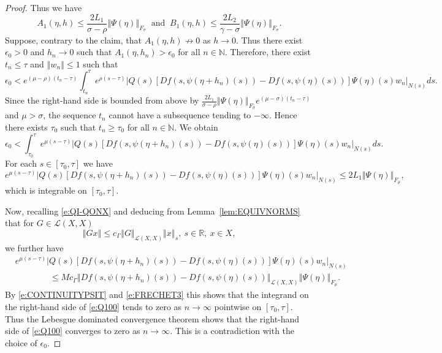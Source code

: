 \documentclass[10pt,a4paper]{amsart}
\newcommand{\N}{\mathbb{N}}
\newcommand{\R}{\mathbb{R}}
\newcommand{\norm}[1]{\left\Vert#1\right\Vert}
\renewcommand{\geq}{\geqslant}
\renewcommand{\leq}{\leqslant}
\begin{document}
\begin{proof}
Thus we have
$$A_1(\eta,h)\leq\frac{2L_1}{\sigma-\rho}\norm{\Psi(\eta)}_{F_\sigma}\ \text{ and }\ B_1(\eta,h)\leq\frac{2L_2}{\gamma-\sigma}\norm{\Psi(\eta)}_{F_\sigma}.$$
Suppose, contrary to the claim, that $A_1(\eta,h)\not\to 0$ as $h\to 0$. Thus there exist $\epsilon_0>0$ and $h_n\to 0$ such that $A_1(\eta,h_n)>\epsilon_0$ for all $n\in\N$. Therefore, there exist $t_n\leq\tau$ and $\norm{w_n}\leq 1$ such that 
$$\epsilon_0<e^{(\mu-\rho)(t_n-\tau)}\int_{t_n}^{\tau}e^{\rho(s-\tau)}|Q(s)[Df(s,\psi(\eta+h_n)(s))-Df(s,\psi(\eta)(s))]\Psi(\eta)(s)w_n|_{N(s)}ds.$$
Since the right-hand side is bounded from above by $\frac{2L_1}{\sigma-\rho}\norm{\Psi(\eta)}_{F_\sigma}e^{(\mu-\sigma)(t_n-\tau)}$ and $\mu>\sigma$,
the sequence $t_n$ cannot have a subsequence tending to $-\infty$. Hence there exists $\tau_0$ such that $t_n\geq\tau_0$ for all $n\in\N$.
We obtain
\begin{equation}\label{e:Q100}
\epsilon_0<\int_{\tau_0}^{\tau}e^{\mu(s-\tau)}|Q(s)[Df(s,\psi(\eta+h_n)(s))-Df(s,\psi(\eta)(s))]\Psi(\eta)(s)w_n|_{N(s)}ds.
\end{equation}
For each  $s\in[\tau_0,\tau]$ we have 
$$e^{\mu(s-\tau)}|Q(s)[Df(s,\psi(\eta+h_n)(s))-Df(s,\psi(\eta)(s))]\Psi(\eta)(s)w_n|_{N(s)}\leq 2L_1\norm{\Psi(\eta)}_{F_\mu},$$
which is integrable on $[\tau_0,\tau]$.

Now, recalling \eqref{e:QI-QONX} 
and deducing from Lemma~\ref{lem:EQUIVNORMS} that for $G\in\mathcal{L}(X,X)$
$$\norm{Gx}\leq c_\Gamma\norm{G}_{\mathcal{L}(X,X)}\norm{x}_{s},\ s\in\R,\ x\in X,$$
we further have
\begin{align*}
&e^{\mu(s-\tau)}|Q(s)[Df(s,\psi(\eta+h_n)(s))-Df(s,\psi(\eta)(s))]\Psi(\eta)(s)w_n|_{N(s)}\\
	&\qquad \qquad  \leq Mc_\Gamma\norm{Df(s,\psi(\eta+h_n)(s))-Df(s,\psi(\eta)(s))}_{\mathcal{L}(X,X)}\norm{\Psi(\eta)}_{F_\mu}.
\end{align*}
By \eqref{e:CONTINUITYPSIT} and \eqref{e:FRECHET3} this shows that the integrand on the right-hand side of \eqref{e:Q100} tends to zero as $n\to\infty$ pointwise on $[\tau_0,\tau]$. 
Thus the Lebesgue dominated convergence theorem shows that the right-hand side of \eqref{e:Q100} converges to zero as $n\to\infty$. This is a contradiction with the choice of $\epsilon_0$.


\end{proof}
\end{document}
